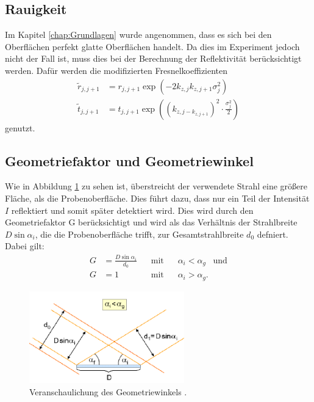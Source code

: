 \subsection{Rauigkeit}
Im Kapitel \ref{chap:Grundlagen} wurde angenommen, dass es sich bei den Oberflächen perfekt glatte Oberflächen handelt. Da dies im Experiment jedoch nicht der Fall ist, muss dies bei der Berechnung der Reflektivität berücksichtigt werden.
Dafür werden die modifizierten Fresnelkoeffizienten
\begin{align*}
    \tilde{r}_{j,j+1}&=r_{j,j+1}\exp(-2k_{z,j}k_{z,j+1}\sigma^2_j)\\
    \tilde{t}_{j,j+1}&=t_{j,j+1}\exp((k_{z,j-k_{z,j+1}})^2 \cdot \frac{\sigma^2_j}{2})
\end{align*}
genutzt. %

\subsection{Geometriefaktor und Geometriewinkel}
Wie in Abbildung \ref{fig:geo} zu sehen ist, überstreicht der verwendete Strahl eine größere Fläche, als die Probenoberfläche. Dies führt dazu, dass nur ein Teil der Intensität $I$ reflektiert und somit später detektiert wird.
Dies wird durch den Geometriefaktor G berücksichtigt und wird als das Verhältnis der Strahlbreite
$D \sin{\alpha_i} $, die die Probenoberfläche trifft, zur Gesamtstrahlbreite $d_0$ defniert.
Dabei gilt:
\begin{align}
    G&=\frac{D\sin\alpha_i}{d_0}\;\;\; &\text{mit}\;\;\; &\alpha_i<\alpha_g\;\;\; \text{und} \label{eqn:geometriefaktor1}\\
    G&=1\;\;\; &\text{mit}\;\;\; &\alpha_i>\alpha_g. \label{eqn:geometriefaktor2}
\end{align}

\begin{figure}
    \centering
    \includegraphics[width=0.6\textwidth]{content/images/Geometriewinkel.png}
    \caption{Veranschaulichung des Geometriewinkels \cite{anleitung}.}
    \label{fig:geo}
  \end{figure}
